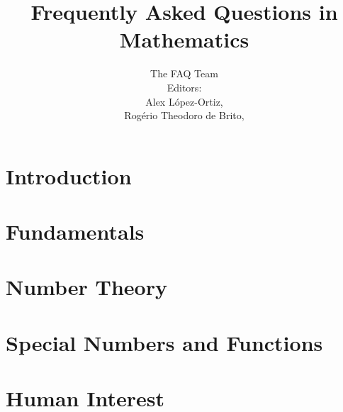 \documentclass[a4paper]{report}
\title{Frequently Asked Questions in Mathematics}
\author{The \scimath FAQ Team\\
  \bigskip
  {\small Editors:}\\
  \bigskip
  {\small Alex L\'{o}pez-Ortiz, \emailalopez}\\
  {\small Rog\'{e}rio Theodoro de Brito, \emailrbrito}
}
\begin{document}
\maketitle
\tableofcontents


\chapter{Introduction}
  
\chapter{Fundamentals}
  
  
  
  
\chapter{Number Theory}
  
  
\chapter{Special Numbers and Functions}
  
  
  
    
  
  
\chapter{Human Interest}
  
  
  
  
  
  
\end{document}

